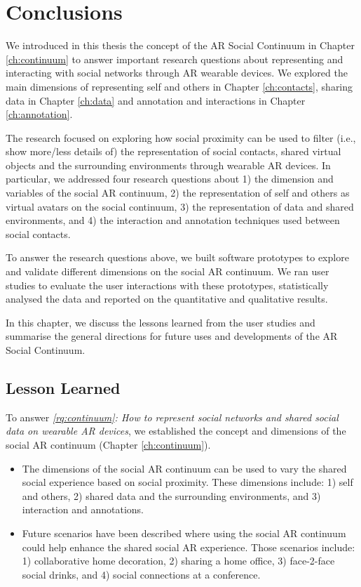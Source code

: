 \chapter{Conclusions}
\label{ch:conclusions}

We introduced in this thesis the concept of the AR Social Continuum in Chapter \ref{ch:continuum} to answer important research questions about representing and interacting with social networks through AR wearable devices. We explored the main dimensions of representing self and others in Chapter \ref{ch:contacts}, sharing data in Chapter \ref{ch:data} and annotation and interactions in Chapter \ref{ch:annotation}. 

The research focused on exploring how social proximity can be used to filter (i.e., show more/less details of) the representation of social contacts, shared virtual objects and the surrounding environments through wearable AR devices. In particular, we addressed four research questions about 1) the dimension and variables of the social AR continuum, 2) the representation of self and others as virtual avatars on the social continuum, 3) the representation of data and shared environments, and 4) the interaction and annotation techniques used between social contacts.   

To answer the research questions above, we built software prototypes to explore and validate different dimensions on the social AR continuum. We ran user studies to evaluate the user interactions with these prototypes, statistically analysed the data and reported on the quantitative and qualitative results. 

In this chapter, we discuss the lessons learned from the user studies and summarise the general directions for future uses and developments of the AR Social Continuum. 

\pagebreak

\section{Lesson Learned}
To answer \textit{\ref{rq:continuum}: How to represent social networks and shared social data on wearable AR devices}, we established the concept and dimensions of the social AR continuum (Chapter \ref{ch:continuum}).

\begin{itemize}
    \item{The dimensions of the social AR continuum can be used to vary the shared social experience based on social proximity. These dimensions include: 1) self and others, 2) shared data and the surrounding environments, and 3) interaction and annotations.}
    \item{Future scenarios have been described where using the social AR continuum could help enhance the shared social AR experience. Those scenarios include: 1) collaborative home decoration, 2) sharing a home office, 3) face-2-face social drinks, and 4) social connections at a conference.}
\end{itemize}

